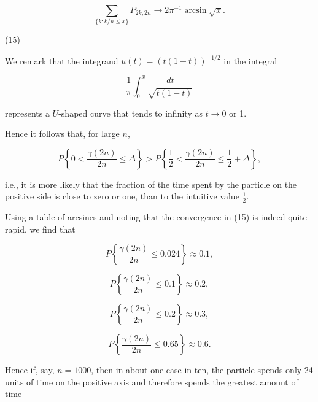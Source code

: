 $$\sum_{\{k : k/n \leq x\}} P_{2k,2n} \rightarrow 2\pi^{-1}\arcsin \sqrt{x}.$$

(15)

We remark that the integrand $u(t) = (t(1-t))^{-1/2}$ in the integral

$$\frac{1}{\pi} \int_{0}^{x} \frac{dt}{\sqrt{t(1-t)}}$$

represents a $U$-shaped curve that tends to infinity as $t \rightarrow 0$ or 1.

Hence it follows that, for large $n$,

$$P\left\{0 < \frac{\gamma(2n)}{2n} \leq \Delta\right\} > P\left\{\frac{1}{2} < \frac{\gamma(2n)}{2n} \leq \frac{1}{2} + \Delta\right\},$$

i.e., it is more likely that the fraction of the time spent by the particle on the positive side is close to zero or one, than to the intuitive value $\frac{1}{2}$.

Using a table of arcsines and noting that the convergence in (15) is indeed quite rapid, we find that

$$P\left\{\frac{\gamma(2n)}{2n} \leq 0.024\right\} \approx 0.1,$$

$$P\left\{\frac{\gamma(2n)}{2n} \leq 0.1\right\} \approx 0.2,$$

$$P\left\{\frac{\gamma(2n)}{2n} \leq 0.2\right\} \approx 0.3,$$

$$P\left\{\frac{\gamma(2n)}{2n} \leq 0.65\right\} \approx 0.6.$$

Hence if, say, $n = 1000$, then in about one case in ten, the particle spends only 24 units of time on the positive axis and therefore spends the greatest amount of time
